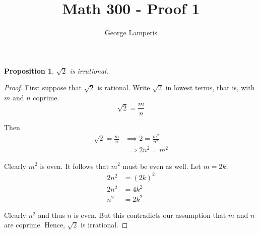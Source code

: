 \documentclass[12pt]{article}
\title{Math 300 - Proof 1}
\author{George Lamperis}
\date{}
\newtheorem*{prop}{Proposition}
\begin{document}
\maketitle

\begin{prop}
 $\sqrt 2$ is irrational.
\end{prop}
\begin{proof}
First suppose that $\sqrt 2$ is rational. Write $\sqrt{2}$ in lowest terms,
that is, with $m$ and $n$ coprime.
\[ \sqrt{2} = \frac{m}{n}\]

Then
\begin{align*}
  \sqrt{2} = \frac{m}{n} &\implies 2 = \frac{m^2}{n^2} \\
                         &\implies 2n^2 = m^2
\end{align*}

Clearly $m^2$ is even. It follows that $m^2$ must be even as well. Let $m = 2k$.
\begin{align*}
  2n^2 &= (2k)^2 \\
  2n^2 &= 4k^2 \\
  n^2  &= 2k^2
\end{align*}

Clearly $n^2$ and thus $n$ is even. But this contradicts our assumption that
$m$ and $n$ are coprime. Hence, $\sqrt 2$ is irrational.
\end{proof}
\end{document}
